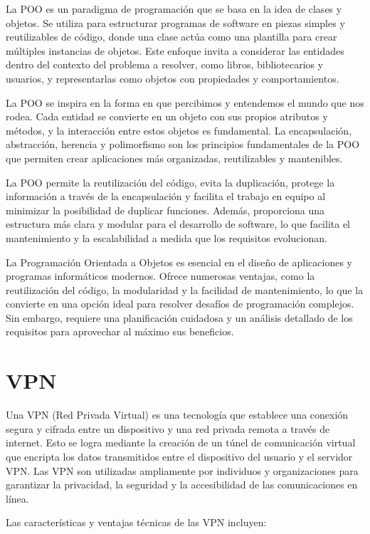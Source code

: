 La POO es un paradigma de programación que se basa en la idea de clases y objetos. Se utiliza para estructurar programas de software en piezas simples y reutilizables de código, donde una clase actúa como una plantilla para crear múltiples instancias de objetos. Este enfoque invita a considerar las entidades dentro del contexto del problema a resolver, como libros, bibliotecarios y usuarios, y representarlas como objetos con propiedades y comportamientos.

La POO se inspira en la forma en que percibimos y entendemos el mundo que nos rodea. Cada entidad se convierte en un objeto con sus propios atributos y métodos, y la interacción entre estos objetos es fundamental. La encapsulación, abstracción, herencia y polimorfismo son los principios fundamentales de la POO que permiten crear aplicaciones más organizadas, reutilizables y mantenibles.

La POO permite la reutilización del código, evita la duplicación, protege la información a través de la encapsulación y facilita el trabajo en equipo al minimizar la posibilidad de duplicar funciones. Además, proporciona una estructura más clara y modular para el desarrollo de software, lo que facilita el mantenimiento y la escalabilidad a medida que los requisitos evolucionan.

La Programación Orientada a Objetos es esencial en el diseño de aplicaciones y programas informáticos modernos. Ofrece numerosas ventajas, como la reutilización del código, la modularidad y la facilidad de mantenimiento, lo que la convierte en una opción ideal para resolver desafíos de programación complejos. Sin embargo, requiere una planificación cuidadosa y un análisis detallado de los requisitos para aprovechar al máximo sus beneficios.

\section{VPN}
\label{sec:vpn}
Una VPN (Red Privada Virtual) es una tecnología que establece una conexión segura y cifrada entre un dispositivo y una red privada remota a través de internet. Esto se logra mediante la creación de un túnel de comunicación virtual que encripta los datos transmitidos entre el dispositivo del usuario y el servidor VPN. Las VPN son utilizadas ampliamente por individuos y organizaciones para garantizar la privacidad, la seguridad y la accesibilidad de las comunicaciones en línea.

Las características y ventajas técnicas de las VPN incluyen:

